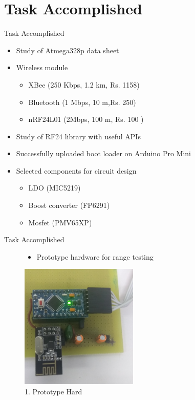 \documentclass[10pt, a4paper]{beamer}
\begin{document}
\section{Task Accomplished}
\begin{frame}{Task Accomplished}
	\begin{itemize}
		\item  Study of Atmega328p data sheet
         \item Wireless module
    	  \begin{itemize}
    	     \item XBee (250 Kbps, 1.2 km, Rs. 1158)
     		 \item Bluetooth (1 Mbps, 10 m,Rs. 250)
     		 \item nRF24L01 (2Mbps, 100 m, Rs. 100 )
        
         \end{itemize}
        \item Study of RF24 library with useful APIs
        \item Successfully uploaded boot loader on Arduino Pro Mini
        \item Selected components for circuit design
        \begin{itemize}
        \item LDO (MIC5219)
        \item  Boost converter (FP6291)
    	\item Mosfet (PMV65XP)
        
        \end{itemize}
        
 \end{itemize}

\end{frame}

\begin{frame}{Task Accomplished}
\begin{figure}
\begin{itemize}
\item Prototype hardware for range testing
\end{itemize}
\begin{center}
\includegraphics[width=0.5\textwidth]{IMG_20180605_144752.jpg}
\caption{1. Prototype Hard}
\end{center}
\end{figure}

\end{frame}
\end{document}
